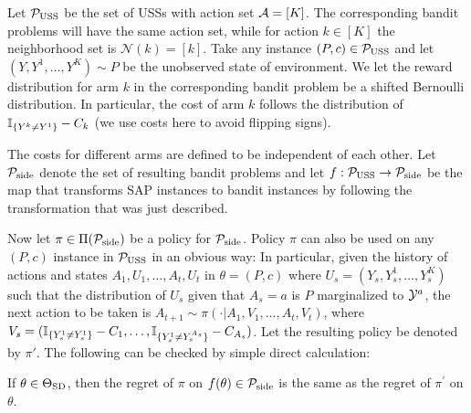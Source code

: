 Let $\mathcal{P}_{\mathrm{USS}}$ be the set of USSs with action set $\mathcal{A} = [K]$.
The corresponding bandit problems will have the same action set,
while for action $k\in [K]$ the neighborhood set is $\mathcal{N}(k) = [k]$.
Take any instance $(P,c)\in \mathcal{P}_{\mathrm{USS}}$ and let $(Y,Y^1,\dots,Y^K) \sim P$ be the 
unobserved state of environment.
We let the reward distribution for arm $k$ in the corresponding bandit problem
be a shifted Bernoulli distribution.
In particular, the cost of arm $k$ follows the distribution of $\mathbb{I}_{\{Y^k\ne Y^1\}} - C_k$ (we use costs here to avoid flipping signs).

The costs for different arms are defined to be independent of each other.
Let $\mathcal{P}_{\mathrm{side}}$ denote the set of resulting bandit problems and let $f:\mathcal{P}_{\mathrm{USS}} \to \mathcal{P}_{\mathrm{side}}$
be the map that transforms SAP instances to bandit instances by following the
transformation that was just described.

Now let $\pi\in \Pi(\mathcal{P}_{\mathrm{side}})$ be a policy for $\mathcal{P}_{\mathrm{side}}$.
Policy $\pi$ can also be used on any $(P,c)$ instance in $\mathcal{P}_{\mathrm{USS}}$ in an obvious way:
In particular, given the history of actions and states $A_1,U_1,\dots,A_t,U_t$
in $\theta=(P,c)$ where $U_s = (Y_s,Y_s^1,\dots,Y_s^{K})$ such that 
the distribution of $U_s$ given that $A_s=a$ is $P$ marginalized to $\mathcal{Y}^{a}$,
the next action to be taken is 
$A_{t+1}\sim \pi(\cdot| A_1, V_1,\dots,A_t,V_t)$, where 
$V_s = (\mathbb{I}_{\{Y_s^1\ne Y_s^1\}}-C_1,\dots,\mathbb{I}_{\{Y_s^1\ne Y_s^{A_s}\}}-C_{A_s})$. Let the resulting policy be denoted by $\pi'$.
The following can be checked by simple direct calculation:
\begin{prop} 
	\label{prop:equivalence}
If $\theta \in \Theta_{\mathrm{SD}}$, then the regret of $\pi$ on $f(\theta)\in \mathcal{P}_{\mathrm{side}}$
is the same as the regret of $\pi^\prime$ on $\theta$. 
\end{prop}

